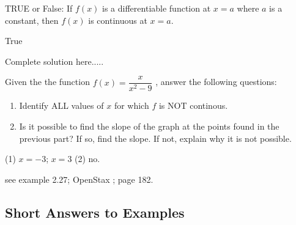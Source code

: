 \begin{example}
TRUE or False: If $f(x)$ is a differentiable function at $x=a$ where $a$ is a constant, then $f(x)$ is continuous at $x=a$.
    \begin{sol}
    True
    \end{sol}
    \begin{solL}
    Complete solution here.....
    
    \end{solL}
    
\end{example}

\begin{example}
Given the the function $f(x)=\dfrac{x}{x^2-9}$ , answer the following questions:

\begin{enumerate}[leftmargin=*]
    \item Identify ALL values of $x$ for which $f$ is NOT continous.
    \item Is it possible to find the slope of the graph at the points found in the previous part? If so, find the slope. If not, explain why it is not possible.
\end{enumerate}
    \begin{sol}
    (1) $x=-3$; $x=3$ (2) no.
    \end{sol}
    \begin{solL}
    see example 2.27; OpenStax ; page 182.
    
    \end{solL}
\end{example}

\subsection*{Short Answers to Examples}
\vspace*{\fill}
\begin{multicols}{3}

\end{multicols}


